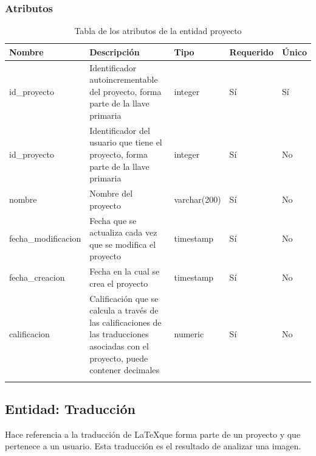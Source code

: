 \subsubsection{Atributos}
\begin{center}
	\begin{longtable}{|J{3cm}|J{4cm}|J{3cm}|J{2cm}|J{2cm}|}
		\hline
		\textbf{Nombre} & \textbf{Descripción} & \textbf{Tipo} & \textbf{Requerido} & \textbf{Único} \\ \hline
		id\_proyecto & Identificador autoincrementable del proyecto, forma parte de la llave primaria & integer & Sí & Sí \\ \hline
		id\_proyecto & Identificador del usuario que tiene el proyecto, forma parte de la llave primaria & integer & Sí & No \\ \hline
		nombre & Nombre del proyecto & varchar(200) & Sí & No \\ \hline
		fecha\_modificacion & Fecha que se actualiza cada vez que se modifica el proyecto & timestamp & Sí & No \\ \hline
		fecha\_creacion & Fecha en la cual se crea el proyecto & timestamp & Sí & No \\ \hline
		calificacion & Calificación que se calcula a través de las calificaciones de las traducciones asociadas con el proyecto, puede contener decimales & numeric & Sí & No \\ \hline
		\caption{Tabla de los atributos de la entidad proyecto}
		\label{tbl:entidad-proyecto}
	\end{longtable}
\end{center}
\subsection{Entidad: Traducción}
Hace referencia a la traducción de \LaTeX que forma parte de un proyecto y que pertenece a un usuario. Esta traducción es el resultado de analizar una imagen.
